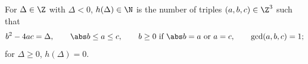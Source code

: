 For $\Delta\in\Z$ with $\Delta<0$, $h(\Delta)\in\N$ is the number of triples $(a,b,c)\in\Z^3$ such that
\[
  b^2-4ac=\Delta,\qquad \abs b\le a\le c,\qquad b\ge0\ \text{if}\ \abs b=a\ \text{or}\ a=c,\qquad \gcd(a,b,c)=1;
\]
for $\Delta\ge0$, $h(\Delta)=0$.
